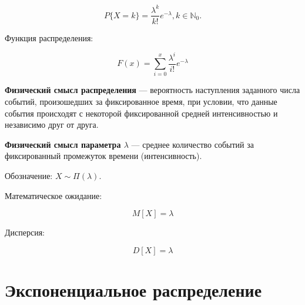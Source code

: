 \begin{equation}
	P\{X=k\} = \frac{\lambda^k}{k!} e^{-\lambda}, k \in \mathbb{N}_0.
\end{equation}

Функция распределения: 

\begin{equation}
	F(x) = \sum\limits_{i = 0}^{x} \frac{\lambda^i}{i!} e^{-\lambda}
\end{equation}

\textbf{Физический смысл распределения} --- вероятность наступления заданного числа событий, произошедших за фиксированное время, при условии, что данные события происходят с некоторой фиксированной средней интенсивностью и независимо друг от друга.

\textbf{Физический смысл параметра $\lambda$} --- среднее количество событий за фиксированный промежуток времени (интенсивность).





Обозначение: $X \sim \Pi(\lambda)$.

Математическое ожидание:

\begin{equation}
	M[X] = \lambda
\end{equation}

Дисперсия: 

\begin{equation}
	D[X] = \lambda
\end{equation}

\chapter{Экспоненциальное распределение} %


